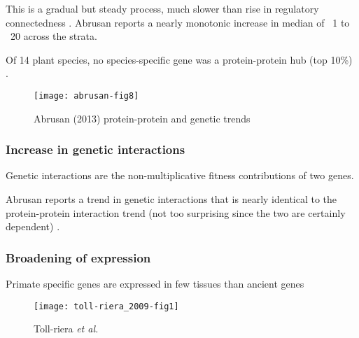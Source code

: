         This is a gradual but steady process, much slower than rise in
        regulatory connectedness \cite{abrusan_integration_2013}. Abrusan
        reports a nearly monotonic increase in median of ~1 to ~20 across
        the strata.

        Of 14 plant species, no species-specific gene was a protein-protein
        hub (top 10\%) \cite{ye_evolutionary_2013}.


        \begin{figure}[!hbpt] \centering
            \texttt{[image: abrusan-fig8]} \caption{Abrusan
            (2013) protein-protein and genetic trends} \end{figure}

    \subsubsection{Increase in genetic interactions}

        Genetic interactions are the non-multiplicative fitness
        contributions of two genes.

        Abrusan reports a trend in genetic interactions that is nearly
        identical to the protein-protein interaction trend (not too
        surprising since the two are certainly dependent)
        \cite{abrusan_integration_2013}.

    \subsubsection{Broadening of expression}

        Primate specific genes are expressed in few tissues than ancient
        genes \cite{toll-riera_origin_2009}

        \begin{figure}[!hbpt] \centering
            \texttt{[image: toll-riera\_2009-fig1]}
            \caption{Toll-riera \textit{et al.}} \end{figure} \FloatBarrier
